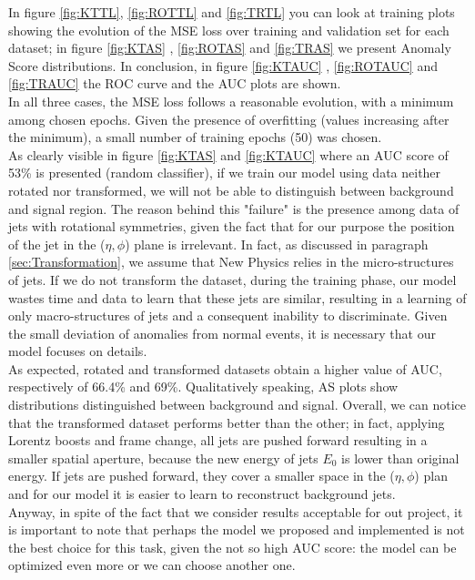 \noindent In figure \ref{fig:KTTL}, \ref{fig:ROTTL} and \ref{fig:TRTL} you can look at training plots showing the evolution of the MSE loss over training and validation set for each dataset; in figure \ref{fig:KTAS} , \ref{fig:ROTAS} and \ref{fig:TRAS} we present Anomaly Score distributions. In conclusion, in figure \ref{fig:KTAUC} , \ref{fig:ROTAUC} and \ref{fig:TRAUC} the ROC curve and the AUC plots are shown.\\
In all three cases, the MSE loss follows a reasonable evolution, with a minimum among chosen epochs. Given the presence of overfitting (values increasing after the minimum), a small number of training epochs (50) was chosen.\\
As clearly visible in figure \ref{fig:KTAS} and \ref{fig:KTAUC} where an AUC score of 53\% is presented (random classifier), if we train our model using data neither rotated nor transformed, we will not be able to distinguish between background and signal region. The reason behind this "failure" is the presence among data of jets with rotational symmetries, given the fact that for our purpose the position of the jet in the ($\eta , \phi $) plane is irrelevant. In fact, as discussed in paragraph \ref{sec:Transformation}, we assume that New Physics relies in the micro-structures of jets. If we do not transform the dataset, during the training phase, our model wastes time and data to learn that these jets are similar, resulting in a learning of only macro-structures of jets and a consequent inability to discriminate. Given the small deviation of anomalies from normal events, it is necessary that our model focuses on details.\\ 
As expected, rotated and transformed datasets obtain a higher value of AUC, respectively of 66.4\% and 69\%. Qualitatively speaking, AS plots show distributions distinguished between background and signal. Overall, we can notice that the transformed dataset performs better than the other; in fact, applying Lorentz boosts and frame change, all jets are pushed forward resulting in a smaller spatial aperture, because the new energy of jets $E_0$ is lower than original energy. If jets are pushed forward, they cover a smaller space in the ($\eta , \phi $) plan and for our model it is easier to learn to reconstruct background jets.\\
Anyway, in spite of the fact that we consider results acceptable for out project, it is important to note that perhaps the model we proposed and implemented is not the best choice for this task, given the not so high AUC score: the model can be optimized even more or we can choose another one.




